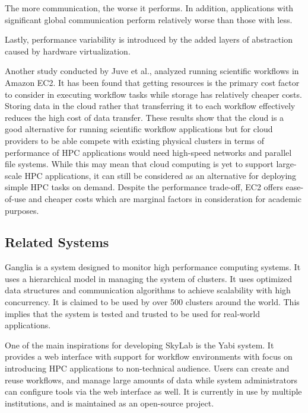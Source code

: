 The more communication, the worse it performs. In addition, applications with significant global communication perform relatively worse than those with less. 

Lastly, performance variability is introduced by the added layers of abstraction caused by hardware virtualization.
         
Another study conducted by Juve et al.\cite{juve_scientific_2009}, analyzed running scientific workflows in Amazon EC2. It has been found that getting resources is the primary cost factor to consider in executing workflow tasks while storage has relatively cheaper costs. Storing data in the cloud rather that transferring it to each workflow effectively reduces the high cost of data transfer. These results show that the cloud is a good alternative for running scientific workflow applications but for cloud providers to be able compete with existing physical clusters in terms of performance of HPC applications would need high-speed networks and parallel file systems\cite{WalkerEC2HPC}. While this may mean that cloud computing is yet to support large-scale HPC applications, it can still be considered as an alternative for deploying simple HPC tasks on demand\cite{PerfAnalysisManyTasks}. Despite the performance trade-off, EC2 offers ease-of-use and cheaper costs which are marginal factors in consideration for academic purposes\cite{ZachHumphrey}.  
         
         
\subsection {Related Systems}

Ganglia is a system designed to monitor high performance computing systems. It uses a hierarchical model in managing the system of clusters. It uses optimized data structures and communication algorithms to achieve scalability with high concurrency. It is claimed to be used by over 500 clusters around the world. This implies that the system is tested and trusted to be used for real-world applications\cite{1395654820040701}.
	    
One of the main inspirations for developing SkyLab is the Yabi system. It provides a web interface with support for workflow environments with focus on introducing HPC applications to non-technical audience. Users can create and reuse workflows, and manage large amounts of data while system administrators can configure tools via the web interface as well. It is currently in use by multiple institutions, and is maintained as an open-source project\cite{7411021620120101}.	    	    
	    
